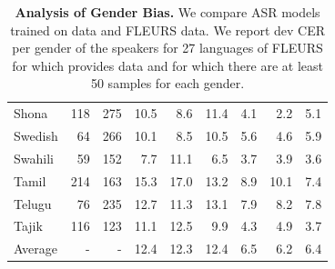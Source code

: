 {\begin{table}[h!]
\begin{tabular}{l|rr|rrr|rrr}
Shona & 118 & 275 & 10.5 & 8.6 & 11.4 & 4.1 & 2.2 & 5.1 \\
Swedish & 64 & 266 & 10.1 & 8.5 & 10.5 & 5.6 & 4.6 & 5.9 \\
Swahili & 59 & 152 & 7.7 & 11.1 & 6.5 & 3.7 & 3.9 & 3.6 \\
Tamil & 214 & 163 & 15.3 & 17.0 & 13.2 & 8.9 & 10.1 & 7.4 \\
Telugu & 76 & 235 & 12.7 & 11.3 & 13.1 & 7.9 & 8.2 & 7.8 \\
Tajik & 116 & 123 & 11.1 & 12.5 & 9.9 & 4.3 & 4.9 & 3.7 \\
\midrule
Average & - & - & 12.4 & 12.3 & 12.4 & 6.5 & 6.2 & 6.4 \\
\bottomrule
\end{tabular}
\vspace{1mm}
\caption{
\textbf{Analysis of Gender Bias.}
We compare ASR models trained on \MMS{} data and FLEURS data.
We report dev CER per gender of the speakers for 27 languages of FLEURS for which \MMS{} provides data and for which there are at least 50 samples for each gender. 
}
\label{tab:rai-gender-full-results} 
\end{table}
}

